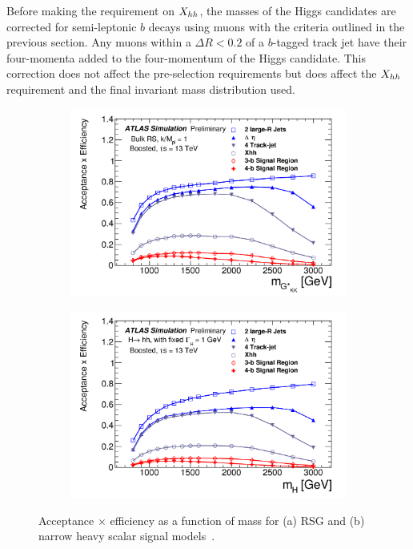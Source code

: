 Before making the requirement on $X_{hh}$, the masses of the Higgs candidates are corrected for semi-leptonic $b$ decays using muons with the criteria outlined in the previous section. Any muons within a $\Delta R < 0.2$ of a $b$-tagged track jet have their four-momenta added to the four-momentum of the Higgs candidate. This correction does not affect the pre-selection requirements but does affect the $X_{hh}$ requirement and the final invariant mass distribution used. 

\begin{figure}[h!]
  \centering
  \captionsetup{justification=centering}

   \begin{subfigure}[t]{0.5\textwidth}
        \centering
        \includegraphics[width=\textwidth]{figures/4b_eff_RSG}
        \caption{}
    \end{subfigure}%
    \begin{subfigure}[t]{0.5\textwidth}
        \centering
        \includegraphics[width=\textwidth]{figures/4b_eff_H}
        \caption{}
    \end{subfigure}

   \caption{Acceptance $\times$ efficiency as a function of mass for (a) RSG and (b) narrow heavy scalar signal models~\cite{4bconf}.}
  \label{fig:4beff}
\end{figure}


